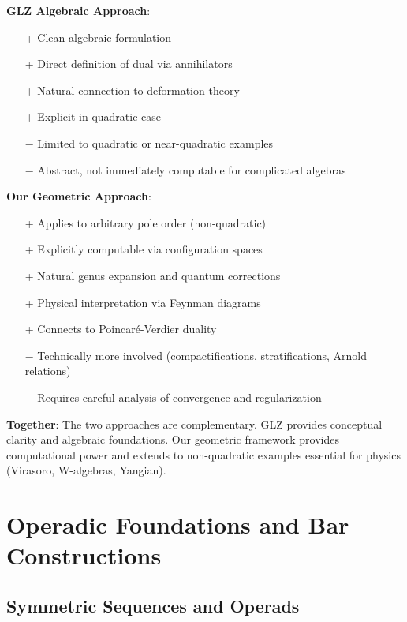 \begin{remark}
\label{rem:advantages-comparison}

\textbf{GLZ Algebraic Approach}:
\begin{itemize}
\item[+] Clean algebraic formulation
\item[+] Direct definition of dual via annihilators
\item[+] Natural connection to deformation theory
\item[+] Explicit in quadratic case
\item[−] Limited to quadratic or near-quadratic examples
\item[−] Abstract, not immediately computable for complicated algebras
\end{itemize}

\textbf{Our Geometric Approach}:
\begin{itemize}
\item[+] Applies to arbitrary pole order (non-quadratic)
\item[+] Explicitly computable via configuration spaces
\item[+] Natural genus expansion and quantum corrections
\item[+] Physical interpretation via Feynman diagrams
\item[+] Connects to Poincaré-Verdier duality
\item[−] Technically more involved (compactifications, stratifications, Arnold relations)
\item[−] Requires careful analysis of convergence and regularization
\end{itemize}

\textbf{Together}: The two approaches are complementary. GLZ provides conceptual clarity 
and algebraic foundations. Our geometric framework provides computational power and extends 
to non-quadratic examples essential for physics (Virasoro, W-algebras, Yangian).
\end{remark}

\chapter{Operadic Foundations and Bar Constructions}

 
\section{Symmetric Sequences and Operads}

